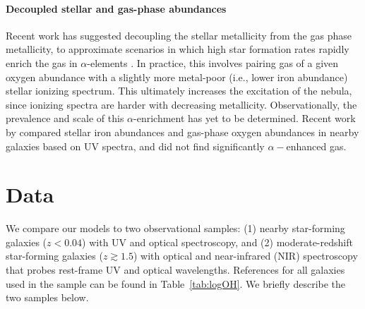 \documentclass[trackchanges, preprint2]{aastex62}
\begin{document}
\paragraph{Decoupled stellar and gas-phase abundances} Recent work has suggested decoupling the stellar metallicity from the gas phase metallicity, to approximate scenarios in which high star formation rates rapidly enrich the gas in $\alpha$-elements \citep[e.g.,][]{Steidel+2016}. In practice, this involves pairing gas of a given oxygen abundance with a slightly more metal-poor (i.e., lower iron abundance) stellar ionizing spectrum. This ultimately increases the excitation of the nebula, since ionizing spectra are harder with decreasing metallicity. Observationally, the prevalence and scale of this $\alpha$-enrichment has yet to be determined. Recent work by \citet{Senchyna+2019} compared stellar iron abundances and gas-phase oxygen abundances in nearby galaxies based on UV spectra, and did not find significantly $\alpha-$enhanced gas.

\section{Data} \label{sec:data}

We compare our models to two observational samples: (1) nearby star-forming galaxies ($z<0.04$) with UV and optical spectroscopy, and (2) moderate-redshift star-forming galaxies ($z \gtrsim 1.5$) with optical and near-infrared (NIR) spectroscopy that probes rest-frame UV and optical wavelengths. References for all galaxies used in the sample can be found in Table~\ref{tab:logOH}. We briefly describe the two samples below.
\end{document}
